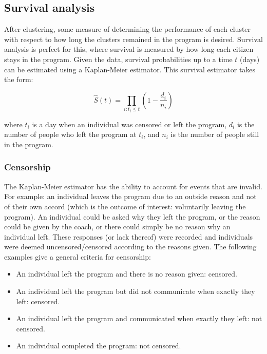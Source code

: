 \documentclass[12pt]{article}
\begin{document}
  
  
  

\newpage

\subsection{Survival analysis}
	
	After clustering, some measure of determining the performance of each cluster with respect to how long the clusters remained in the program is desired. Survival analysis is perfect for this, where survival is measured by how long each citizen stays in the program. Given the data, survival probabilities up to a time $t$ (days) can be estimated using a Kaplan-Meier estimator. This survival estimator takes the form:
	
	$$
	\widehat{S}(t) = \prod_{i: t_i \leq t} \left( 1 - \frac{d_i}{n_i} \right)
	$$
	
	where $t_i$ is a day when an individual was censored or left the program, $d_i$ is the number of people who left the program at $t_i$, and $n_i$ is the number of people still in the program.
	
	
	
	\subsubsection{Censorship}
	
	The Kaplan-Meier estimator has the ability to account for events that are invalid. For example: an individual leaves the program due to an outside reason and not of their own accord (which is the outcome of interest: voluntarily leaving the program). An individual could be asked why they left the program, or the reason could be given by the coach, or there could simply be no reason why an individual left. These responses (or lack thereof) were recorded and individuals were deemed uncensored/censored according to the reasons given. The following examples give a general criteria for censorship:
	\begin{itemize}
		\item An individual left the program and there is no reason given: censored.
		\item An individual left the program but did not communicate when exactly they left: censored.
		\item An individual left the program and communicated when exactly they left: not censored.
		\item An individual completed the program: not censored.
	\end{itemize}
	
\end{document}
